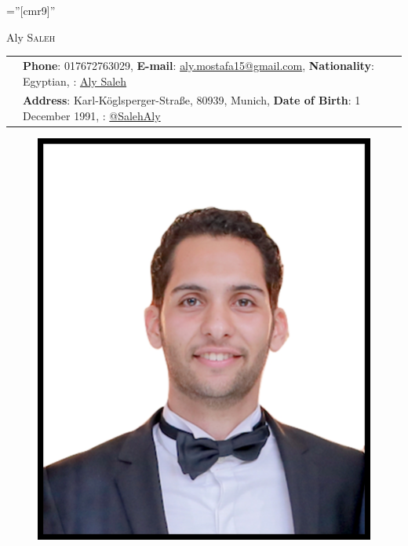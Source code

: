 \documentclass[a4paper,13pt]{article}
\begin{document}
\pagestyle{empty} %

\font\fb=''[cmr9]'' %


\par{\hspace{5cm}\huge Aly \textsc{Saleh}\par} %



\begin{adjustwidth}{-3cm}{}

\begin{tabular}{rl}
	&	\textbf{Phone}: 017672763029, 
		  \textbf{E-mail}: 	\href{mailto:aly.mostafa15@gmail.com}{aly.mostafa15@gmail.com},
 		  \textbf{Nationality}: Egyptian,  \faLinkedin: \href{https://de.linkedin.com/in/aly-saleh-ba948164}{Aly Saleh}
 
	\\&	\textbf{Address}: Karl-Köglsperger-Straße, 80939, Munich, 
		 \textbf{Date of Birth}: 1 December 1991,		 \faGithub:  \href{https://github.com/SalehAly}{@SalehAly}\\

\end{tabular}
\begin{figure}
	\begin{center}
	\hspace{14cm} \vspace{-3cm} \includegraphics[scale=0.07]{me.jpg}	
	\end{center}


\end{figure}
\end{adjustwidth}
\end{document}
